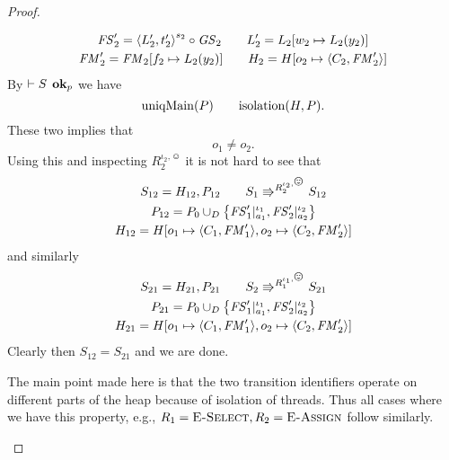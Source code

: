 \begin{proof}
\begin{description}
\begin{equation}
\begin{gathered}
          \mathit{FS}'_2 = \mbox{$\langle L'_2, t'_2 \rangle$}^{s_2} \circ \mathit{GS}_2  \quad\quad L'_2 = L_2[w_2 \mapsto
          L_2(y_2)] \\
          \mathit{FM}'_2 = \mathit{FM}_2[f_2 \mapsto L_2(y_2)] \quad\quad H_2 = H[o_2 \mapsto
          \mbox{$\langle C_2, \mathit{FM}'_2 \rangle$}]
          \\
        \end{gathered}
      \end{equation}
      By $\vdash S \:\: \mbox{{\bf ok}$_p$}$ we have
      \begin{equation}
        \mbox{$\mathrm{uniqMain}$}(P) \quad\quad \mbox{$\mathrm{isolation}$}(H, P).
      \end{equation}
      These two implies that
      \begin{equation}
        o_1 \neq o_2.
      \end{equation}
      Using this and inspecting $R_2^{\iota_2, \smiley}$ it is not hard to see
      that 
      \begin{equation}
        \begin{gathered}
          S_{12} = H_{12}, P_{12} \andalso S_1 \Rrightarrow^{R_2^{\iota_2,
          \smiley}} S_{12}
          \\
          P_{12} = P_0 \cup_D \left\{ \FS'_1|_{a_1}^{\iota_1},
          \FS'_2|_{a_2}^{\iota_2} \right\} \\
          H_{12} = H[o_1 \mapsto \Obj{C_1, \FM'_1}, o_2 \mapsto \Obj{C_2, \FM'_2}]
        \end{gathered}
      \end{equation}
      and similarly 
      \begin{equation}
        \begin{gathered}
          S_{21} = H_{21}, P_{21} \andalso S_2 \Rrightarrow^{R_1^{\iota_1,
          \smiley}} S_{21}
          \\
          P_{21} = P_0 \cup_D \left\{ \FS'_1|_{a_1}^{\iota_1},
          \FS'_2|_{a_2}^{\iota_2} \right\} \\
          H_{21} = H[o_1 \mapsto \Obj{C_1, \FM'_1}, o_2 \mapsto \Obj{C_2, \FM'_2}]
        \end{gathered}
      \end{equation}
      Clearly then $S_{12} = S_{21}$ and we are done.
      \begin{remark}
        The main point made here is that the two transition identifiers operate
        on different parts of the heap because of isolation of threads. Thus all
        cases where we have this property, e.g., $R_1 = \mbox{{\sc E-Select}}, R_2 =
        \mbox{{\sc E-Assign}}$ follow similarly.
      \end{remark}

\end{description}
\end{proof}
